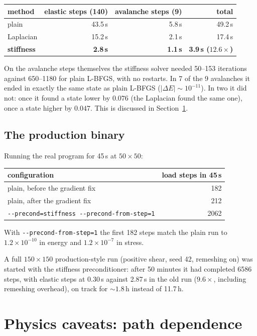 \documentclass[11pt,a4paper]{article}
\theoremstyle{remark}
\newcommand{\code}[1]{\texttt{#1}}
\begin{document}
\begin{center}
\begin{tabular}{lrrr}
\toprule
method & elastic steps (140) & avalanche steps (9) & total \\
\midrule
plain & 43.5\,s & 5.8\,s & 49.2\,s\\
Laplacian & 15.2\,s & 2.1\,s & 17.4\,s\\
\textbf{stiffness} & \textbf{2.8\,s} & \textbf{1.1\,s} & \textbf{3.9\,s ($12.6\times$)}\\
\bottomrule
\end{tabular}
\end{center}
On the avalanche steps themselves the stiffness solver needed 50--153 iterations against
650--1180 for plain L-BFGS, with no restarts. In 7 of the 9 avalanches it ended in exactly the
same state as plain L-BFGS ($|\Delta E|\sim10^{-11}$). In two it did not: once it found a state
lower by $0.076$ (the Laplacian found the same one), once a state higher by $0.047$. This is
discussed in Section~\ref{sec:physics}.

\subsection{The production binary}

Running the real program for 45\,s at $50\times50$:
\begin{center}
\begin{tabular}{lr}
\toprule
configuration & load steps in 45\,s\\
\midrule
plain, before the gradient fix & 182\\
plain, after the gradient fix & 212\\
\code{-{}-precond=stiffness -{}-precond-from-step=1} & 2062\\
\bottomrule
\end{tabular}
\end{center}
With \code{-{}-precond-from-step=1} the first 182 steps match the plain run to $1.2\times10^{-10}$
in energy and $1.2\times10^{-7}$ in stress.

A full $150\times150$ production-style run (positive shear, seed 42, remeshing on) was started
with the stiffness preconditioner: after 50 minutes it had completed 6586 steps, with elastic
steps at 0.30\,s against 2.87\,s in the old run ($9.6\times$, including remeshing overhead), on
track for $\sim1.8$\,h instead of 11.7\,h.

\section{Physics caveats: path dependence}
\label{sec:physics}
\end{document}
